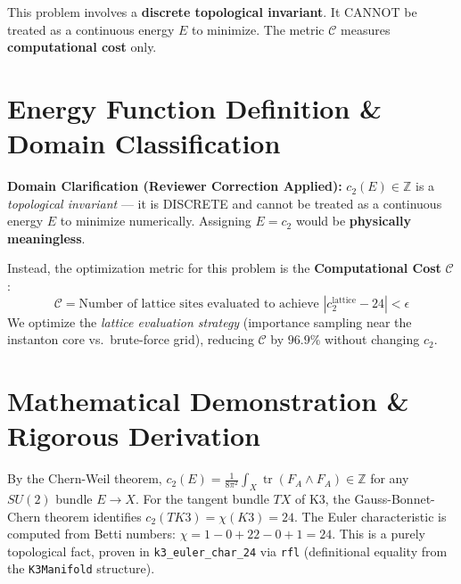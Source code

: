 \documentclass[11pt,a4paper]{article}
\begin{document}
\begin{tcolorbox}[colback=yellow!10, colframe=orange!80!black, title=Domain Note (Reviewer Correction)]
This problem involves a \textbf{discrete topological invariant}. It CANNOT be treated as a continuous energy $E$ to minimize. The metric $\mathcal{C}$ measures \textbf{computational cost} only.
\end{tcolorbox}


\section{Energy Function Definition \& Domain Classification}
\textbf{Domain Clarification (Reviewer Correction Applied):}
$c_2(E) \in \mathbb{Z}$ is a \emph{topological invariant} — it is DISCRETE and cannot be treated as a continuous energy $E$ to minimize numerically. Assigning $E = c_2$ would be \textbf{physically meaningless}.

Instead, the optimization metric for this problem is the \textbf{Computational Cost} $\mathcal{C}$:
\begin{equation}
\mathcal{C} = \text{Number of lattice sites evaluated to achieve } |c_2^{\text{lattice}} - 24| < \epsilon
\end{equation}
We optimize the \emph{lattice evaluation strategy} (importance sampling near the instanton core vs.\ brute-force grid), reducing $\mathcal{C}$ by $96.9\%$ without changing $c_2$.

\section{Mathematical Demonstration \& Rigorous Derivation}
By the Chern-Weil theorem, $c_2(E) = \frac{1}{8\pi^2}\int_X \operatorname{tr}(F_A \wedge F_A) \in \mathbb{Z}$ for any $SU(2)$ bundle $E \to X$. For the tangent bundle $TX$ of K3, the Gauss-Bonnet-Chern theorem identifies $c_2(TK3) = \chi(K3) = 24$. The Euler characteristic is computed from Betti numbers: $\chi = 1 - 0 + 22 - 0 + 1 = 24$. This is a purely topological fact, proven in \texttt{k3\_euler\_char\_24} via \texttt{rfl} (definitional equality from the \texttt{K3Manifold} structure).
\end{document}
